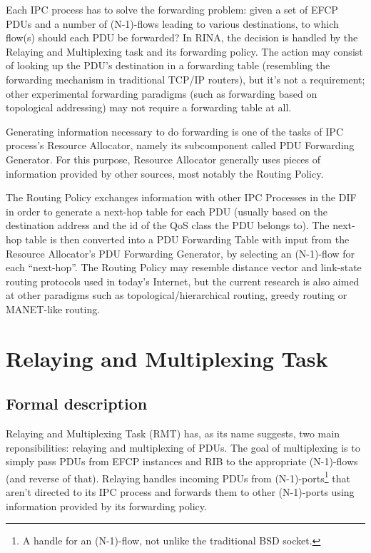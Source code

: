         Each IPC process has to solve the forwarding problem: given a set of EFCP PDUs and a number of (N-1)-flows leading to various destinations, to which flow(s) should each PDU be forwarded? In RINA, the decision is handled by the Relaying and Multiplexing task and its forwarding policy. The action may consist of looking up the PDU's destination in a forwarding table (resembling the forwarding mechanism in traditional TCP/IP routers), but it's not a requirement; other experimental forwarding paradigms (such as forwarding based on topological addressing) may not require a forwarding table at all.

        Generating information necessary to do forwarding is one of the tasks of IPC process's Resource Allocator, namely its subcomponent called PDU Forwarding Generator. For this purpose, Resource Allocator generally uses pieces of information provided by other sources, most notably the Routing Policy.

        The Routing Policy exchanges information with other IPC Processes in the DIF in order to generate a next-hop table for each PDU (usually based on the destination address and the id of the QoS class the PDU belongs to). The next-hop table is then converted into a PDU Forwarding Table with input from the Resource Allocator's PDU Forwarding Generator, by selecting an (N-1)-flow for each ``next-hop''. The Routing Policy may resemble distance vector and link-state routing protocols used in today's Internet, but the current research is also aimed at other paradigms such as topological/hierarchical routing, greedy routing or MANET-like routing.


    \section{Relaying and Multiplexing Task}

        \subsection{Formal description}

            Relaying and Multiplexing Task (RMT) has, as its name suggests, two main reponsibilities: relaying and multiplexing of PDUs. The goal of multiplexing is to simply pass PDUs from EFCP instances and RIB to the appropriate (N-1)-flows (and reverse of that). Relaying handles incoming PDUs from (N-1)-ports\footnote{A handle for an (N-1)-flow, not unlike the traditional BSD socket.} that aren't directed to its IPC process and forwards them to other (N-1)-ports using information provided by its forwarding policy.

